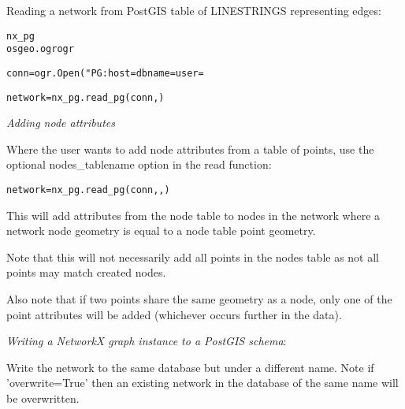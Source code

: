 Reading a network from PostGIS table of LINESTRINGS representing edges:

\begin{alltt}
\pysrcprompt{{\textgreater}{\textgreater}{\textgreater} } nx\_pg
\pysrcprompt{{\textgreater}{\textgreater}{\textgreater} } osgeo.ogr  ogr\end{alltt}
\begin{alltt}
\pysrcprompt{{\textgreater}{\textgreater}{\textgreater} }
\pysrcprompt{{\textgreater}{\textgreater}{\textgreater} }conn = ogr.Open("PG: host= dbname= user=
\end{alltt}
\begin{alltt}
\pysrcprompt{{\textgreater}{\textgreater}{\textgreater} }
\pysrcprompt{{\textgreater}{\textgreater}{\textgreater} }\end{alltt}
\begin{alltt}
\pysrcprompt{{\textgreater}{\textgreater}{\textgreater} }network = nx\_pg.read\_pg(conn, )\end{alltt}
\textit{Adding node attributes}

Where the user wants to add node attributes from a table of points, use the
optional nodes\_tablename option in the read function:

\begin{alltt}
\pysrcprompt{{\textgreater}{\textgreater}{\textgreater} }network = nx\_pg.read\_pg(conn, , )\end{alltt}
This will add attributes from the node table to nodes in the network where 
a network node geometry is equal to a node table point geometry.

Note that this will not necessarily add all points in the nodes table as 
not all points may match created nodes.

Also note that if two points share the same geometry as a node, only one of
the point attributes will be added (whichever occurs further in the data).

\textit{Writing a NetworkX graph instance to a PostGIS schema}:

Write the network to the same database but under a different name. Note if 
'overwrite=True' then an existing network in the database of the same name 
will be overwritten.

